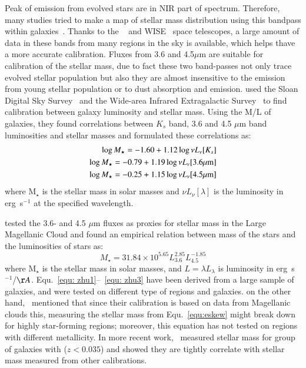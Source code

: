Peak of emission from evolved stars are in NIR part of spectrum.
Therefore, many studies tried to make a map of stellar mass distribution using this bandpass within galaxies~\citep[e.g.,][]{Elmgreen84}.
Thanks to the \Spitzer~\citep{Wener04} and WISE~\citep{Wright10} space telescopes, a large amount of data in these bands from many regions in the sky is available, which helps thave a more accurate calibration. 
Fluxes from 3.6 and 4.5$\mu$m are suitable for calibration of the stellar mass, due to fact these two band-passes not only trace evolved stellar population but also they are almost insensitive to the emission from young stellar population or to dust absorption and emission. 
\cite{Zhu10} used the Sloan Digital Sky Survey~\citep[SDSS][]{York00} and the \Spitzer Wide-area Infrared Extragalactic Survey~\citep[SWIRE;][] {Lonsdale03} to find calibration between galaxy luminosity and stellar mass. 
Using the M/L of galaxies, they found correlations between $K_s$ band, 3.6 and 4.5 $\mu$m band luminosities and stellar masses and formulated these correlations as:
\begin{align}
\label{equ: zhu1}
\log M_{\star} = -1.60  + 1.12  \log \nu L_{\nu}[K_s]\\
\log M_{\star} = -0.79 + 1.19 \log \nu L_{\nu}[3.6\mu \rm m]\\
\label{equ: zhu3}
\log M_{\star} = -0.25 + 1.15\log \nu L_{\nu}[4.5\mu \rm m] 
\end{align}
where M$_{\star}$ is the stellar mass in solar masses and $ \nu L_{\nu}[\lambda]$ is the luminosity in erg~s$^{-1}$ at the specified wavelength.

\cite{Eskew12} tested the 3.6- and 4.5 $\mu$m fluxes as proxies for stellar mass in the Large Magellanic Cloud and found an empirical relation between mass of the stars and the luminosities of stars as:
\begin{equation}
\label{equ:eskew}
  M_{\star} = 31.84 \times 10^{5.65} L_{3.6}^{2.85} L_{4.5}^{-1.85}
\end{equation}
where M$_{\star}$ is the stellar mass in solar masses, and $L = \lambda L_{\lambda}$ is luminosity in erg~s$^{-1}$/$\AA$.
Equ.~\ref{equ: zhu1}--~\ref{equ: zhu3} have been derived from a large sample of galaxies, and were tested on different type of regions and galaxies. 
on the other hand,~\cite{Eskew12} mentioned that since their calibration is based on data from Magellanic clouds this,
measuring the stellar mass from Equ.~\ref{equ:eskew} might break down for highly star-forming regions; moreover, this equation has not tested on regions with different metallicity. 
In more recent work,~\cite{Laura16} measured stellar mass for group of galaxies with ($z < 0.035$) and  showed they are tightly correlate with stellar mass measured from other calibrations. 

